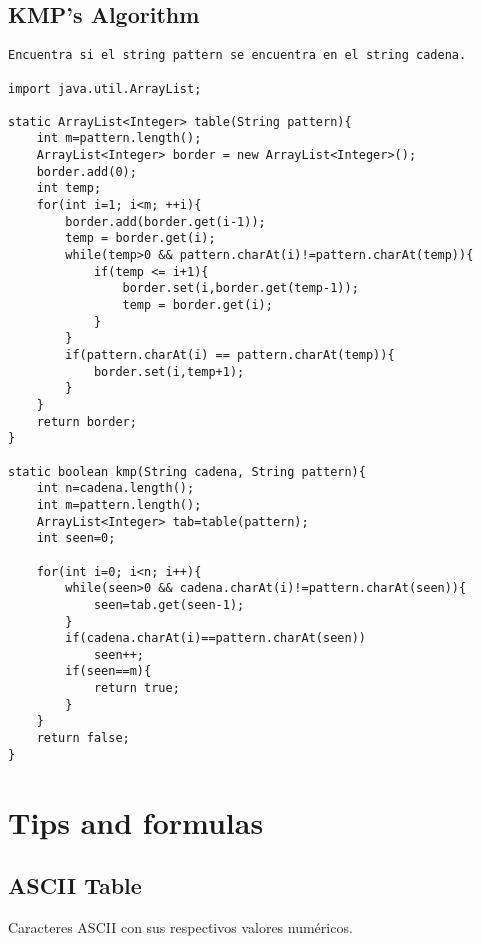 \documentclass[10pt,letterpaper,twocolumn,twosided]{article}
\begin{document}
\subsection{KMP's Algorithm}
\begin{lstlisting}
Encuentra si el string pattern se encuentra en el string cadena.

import java.util.ArrayList;

static ArrayList<Integer> table(String pattern){
	int m=pattern.length();
	ArrayList<Integer> border = new ArrayList<Integer>();
	border.add(0);
	int temp;
	for(int i=1; i<m; ++i){
		border.add(border.get(i-1));
		temp = border.get(i);
		while(temp>0 && pattern.charAt(i)!=pattern.charAt(temp)){
			if(temp <= i+1){
				border.set(i,border.get(temp-1));
				temp = border.get(i);
			}
		}
		if(pattern.charAt(i) == pattern.charAt(temp)){
			border.set(i,temp+1);
		}
	}
	return border;
}

static boolean kmp(String cadena, String pattern){
	int n=cadena.length();
	int m=pattern.length();
	ArrayList<Integer> tab=table(pattern);
	int seen=0;

	for(int i=0; i<n; i++){
		while(seen>0 && cadena.charAt(i)!=pattern.charAt(seen)){
			seen=tab.get(seen-1);
		}
		if(cadena.charAt(i)==pattern.charAt(seen))
			seen++;
		if(seen==m){
			return true;
		}
	}
	return false;
}
\end{lstlisting}

\section{Tips and formulas}

\subsection{ASCII Table}
Caracteres ASCII con sus respectivos valores numéricos.
\end{document}
